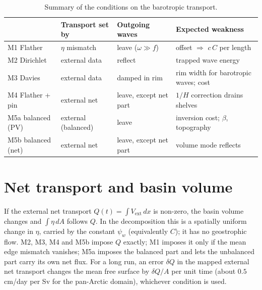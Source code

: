 \documentclass[11pt]{article}
\newcommand{\ext}{\mathrm{ext}}
\begin{document}
\begin{table}[h]
\centering
\begin{tabular}{@{}l>{\raggedright}p{3.6cm}>{\raggedright}p{3.4cm}>{\raggedright\arraybackslash}p{4.4cm}@{}}
\toprule
 & Transport set by & Outgoing waves & Expected weakness \\
\midrule
M1 Flather          & $\eta$ mismatch          & leave ($\omega\gg f$)   & offset $\Rightarrow$ $c\,C$ per length \\
M2 Dirichlet        & external data            & reflect                 & trapped wave energy \\
M3 Davies           & external data            & damped in rim           & rim width for barotropic waves; cost \\
M4 Flather + pin    & external net             & leave, except net part  & $1/H$ correction drains shelves \\
M5a balanced (PV)   & external (balanced)      & leave                   & inversion cost; $\beta$, topography \\
M5b balanced (net)  & external net             & leave, except net part  & volume mode reflects \\
\bottomrule
\end{tabular}
\caption{Summary of the conditions on the barotropic transport.}
\end{table}

\section{Net transport and basin volume}
\label{sec:net}

If the external net transport $Q(t)=\int V_\ext\,dx$ is non-zero, the basin volume changes and $\int\eta\,dA$
follows $Q$. In the decomposition this is a spatially uniform change in $\eta$, carried by the constant $\psi_w$
(equivalently $C$); it has no geostrophic flow. M2, M3, M4 and M5b impose $Q$ exactly; M1 imposes it only if the
mean edge mismatch vanishes; M5a imposes the balanced part and lets the unbalanced part carry its own net flux.
For a long run, an error $\delta Q$ in the mapped external net transport changes the mean free surface by
$\delta Q/A$ per unit time (about $0.5$ cm/day per Sv for the pan-Arctic domain), whichever condition is used.

\end{document}
